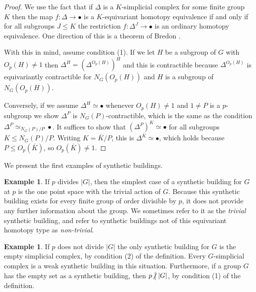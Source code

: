 \documentclass[12pt]{amsart}
\theoremstyle{plain}
\theoremstyle{definition}
\newtheorem{example}[theorem]{Example}
\theoremstyle{remark}
\numberwithin{equation}{section}
\newcommand{\notdivide}{\kern-2.1pt\not\kern2.1pt\bigm|}
\begin{document}
\begin{proof}
    We use the fact that if $\Delta$ is a $K$-simplicial complex for some finite group $K$ then the map $f:\Delta\to \bullet$ is a $K$-equivariant homotopy equivalence if and only if for all subgroups $J\le K$ the restriction $f:\Delta^J\to \bullet$ is an ordinary homotopy equivalence. One direction of this is a theorem of Bredon \cite[Sect. II]{Bre1967}.

With this in mind, assume condition (1). If we let $H$ be a subgroup of $G$ with $O_p(H)\ne 1$ then $\Delta^H = (\Delta^{O_p(H)})^H $ and this is contractible because $\Delta^{O_p(H)}$ is equivariantly contractible for $N_G(O_p(H))$ and $H$ is a subgroup of $N_G(O_p(H))$.

Conversely, if we assume $\Delta^H\simeq \bullet$ whenever $O_p(H)\ne 1$ and $1\ne P$ is a $p$-subgroup we show $\Delta^P$ is $N_G(P)$-contractible, which is the same as the condition $\Delta^P\simeq_{N_G(P)/P}\bullet$. It suffices to show that $(\Delta^P)^K\simeq\bullet$ for all subgroups $K\le N_G(P)/P$. Writing $K=\bar K/P$, this is $\Delta^{\bar K}\simeq \bullet$, which holds because $P\le O_p(\bar K)$, so $O_p(\bar K)\ne 1$.
\end{proof}

We present the first examples of synthetic buildings.

\begin{example}
    If $p$ divides $|G|$, then the simplest case of a synthetic building for $G$ at $p$ is the one point space with the trivial action of $G$. Because this synthetic building exists for every finite group of order divisible by $p$, it does not provide any further information about the group. We sometimes refer to it as the \textit{trivial} synthetic building, and refer to synthetic buildings not of this equivariant homotopy type as \textit{non-trivial}.
\end{example}

\begin{example}
    If $p$ does not divide $|G|$ the only synthetic building for $G$ is the empty simplicial complex, by condition (2) of the definition. Every $G$-simplicial complex is a weak synthetic building in this situation. Furthermore, if a group $G$ has the empty set as a synthetic building, then $p\notdivide |G|$, by condition (1) of the definition. 
\end{example}
\end{document}
